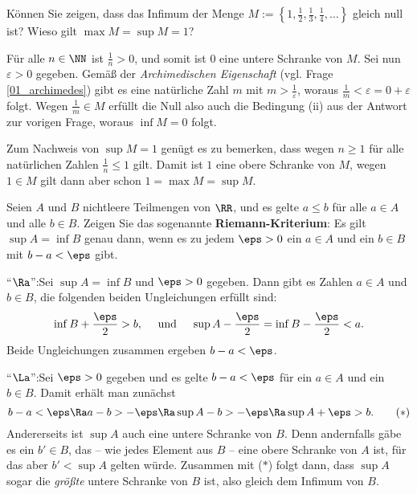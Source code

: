 \begin{frage}
  Können Sie zeigen, dass das Infimum der Menge 
  $M:=\left\{ 1, \frac{1}{2}, \frac{1}{3}, \frac{1}{4}, \ldots \right\}$ 
  gleich null ist?  Wieso gilt $\max M=\sup M=1$?
\end{frage}

\begin{antwort}
  Für alle $n \in \NN$ ist $\frac{1}{n}>0$, 
  und somit ist $0$ eine untere Schranke von $M$. 
  Sei nun $\varepsilon > 0$ gegeben. Gemäß der  
  \textit{Archimedischen Eigenschaft} (vgl. Frage \ref{01_archimedes}) 
  gibt es eine natürliche Zahl $m$ mit $m>\frac{1}{\varepsilon}$, woraus 
  $\frac{1}{m} < \varepsilon = 0+\varepsilon $ folgt. Wegen $\frac{1}{m}\in M$ 
  erfüllt die Null also auch die Bedingung (ii) aus der Antwort zur vorigen 
  Frage, woraus $\inf M=0$ folgt.

  Zum Nachweis von $\sup M=1$ genügt es zu bemerken, dass wegen $n \ge 1$ 
  für alle natürlichen Zahlen $\frac{1}{n}\le 1$ gilt. 
  Damit ist $1$ eine obere Schranke von $M$,  
  wegen $1\in M$ gilt dann aber schon $1=\max M=\sup M$.
  \AntEnd
\end{antwort}

\begin{frage}
  Seien $A$ und $B$ nichtleere Teilmengen von $\RR$, und es gelte 
  $a\le b$ für alle $a\in A$ und alle $b\in B$. 
  Zeigen Sie das sogenannte \textbf{Riemann-Kriterium}: 
  Es gilt 
  $\sup A=\inf B$ genau dann, wenn es zu jedem $\eps > 0$ ein $a\in A$ 
  und ein $b\in B$ mit $b-a < \eps$ gibt. 
\end{frage}

\begin{antwort}
  "`$\Ra$"':\quad Sei $\sup A = \inf B$ und $\eps>0$ gegeben. 
  Dann gibt es Zahlen $a\in A$ und $b\in B$, {\sd} die folgenden 
  beiden Ungleichungen erfüllt sind: 
  \[
  \inf B+\frac{\eps}{2} > b, \quad{\text{ und }}\quad 
  \sup A-\frac{\eps}{2} = \inf B - \frac{\eps}{2} < a.
  \]
  Beide Ungleichungen zusammen ergeben $b-a<\eps$.

  "`$\La$"':\quad Sei $\eps>0$ gegeben und es gelte $b-a<\eps$ 
  für ein $a\in A$ und ein $b\in B$. Damit erhält man zunächst 
  \begin{equation}
    b-a<\eps \Ra
    a-b > -\eps \Ra
    \sup A-b > - \eps \Ra
    \sup A+\eps > b. \tag{$\ast$}
  \end{equation}
  Andererseits ist $\sup A$ auch eine untere Schranke von $B$.
  Denn andernfalls 
  gäbe es ein $b'\in B$, das -- wie jedes Element aus $B$ -- eine 
  obere Schranke von $A$ ist, für das aber $b'<\sup A$ gelten würde. 
  Zusammen mit ($\ast$) folgt dann, dass $\sup A$ sogar die 
  \textit{größte} untere Schranke 
  von $B$ ist, also gleich dem Infimum von $B$.     
  \AntEnd
\end{antwort}


